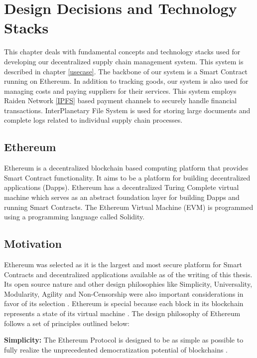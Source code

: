 \section{Design Decisions and Technology Stacks} \label{TS} 
This chapter deals with fundamental concepts and technology stacks used for developing our decentralized supply chain management system. This system is described in chapter \ref{usecase}. The backbone of our system is a Smart Contract running on Ethereum. In addition to tracking goods, our system is also used for managing costs and paying suppliers for their services. This system employs Raiden Network \ref{IPFS} based payment channels to securely handle financial transactions. InterPlanetary File System is used for storing large documents and complete logs related to individual supply chain processes. 
 
\vspace{0.5cm}
\subsection{Ethereum}\label{eth}
Ethereum is a decentralized blockchain based computing platform that provides Smart Contract functionality. It aims to be a platform for building decentralized applications (Dapps). Ethereum has a decentralized Turing Complete virtual machine which serves as an abstract foundation layer for building Dapps and running Smart Contracts. The Ethereum Virtual Machine (EVM) is programmed using a programming language called Solidity.
\subsection*{Motivation}
Ethereum was selected as it is the largest and most secure platform for Smart Contracts and decentralized applications available as of the writing of this thesis. Its open source nature and other design philosophies like Simplicity, Universality, Modularity, Agility and Non-Censorship were also important considerations in favor of its selection \cite{eth:001}. Ethereum is special because each block in its blockchain represents a state of its virtual machine \cite{eth:001}. The design philosophy of Ethereum follows a set of principles outlined below:

\textbf{Simplicity:} The Ethereum Protocol is designed to be as simple as possible to fully realize the unprecedented democratization potential of blockchains \cite{eth:001}. 

